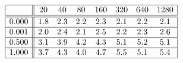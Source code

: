 \[
\begin{array}{|c||ccccccc|}
\hline 
& 20 & 40 & 80 & 160 & 320 & 640 & 1280\\
\hline \hline 
0.000 & 1.8 & 2.3 & 2.2 & 2.3 & 2.1 & 2.2 & 2.1 \\ \hline 
0.001 & 2.0 & 2.4 & 2.1 & 2.5 & 2.2 & 2.3 & 2.6 \\ \hline 
0.500 & 3.1 & 3.9 & 4.2 & 4.3 & 5.1 & 5.2 & 5.1 \\ \hline 
1.000 & 3.7 & 4.3 & 4.0 & 4.7 & 5.5 & 5.1 & 5.4 \\ \hline 
\end{array}
\]

